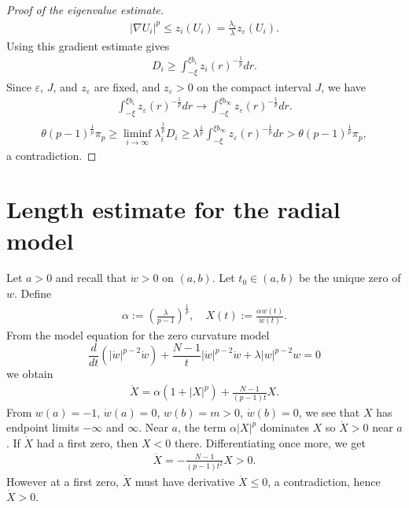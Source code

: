 \documentclass[11pt]{amsart}
\def \eps {\varepsilon}
\theoremstyle{definition}
\begin{document}
\begin{proof}[Proof of the eigenvalue estimate]
\begin{align*}
    |\nabla U_i|^p\leq z_i(U_i)=\frac{\lambda_i}{\lambda}z_\eps(U_i).
\end{align*}
Using this gradient estimate gives
\begin{align*}
    D_i \geq \int_{-\xi}^{\xi b_i}z_i(r)^{-\frac{1}{p}}dr.
\end{align*}
Since $\eps$, $J$, and $z_\eps$ are fixed, and $z_\eps>0$ on the compact interval $J$, we have
\begin{align*}
    \int_{-\xi}^{\xi b_i}z_\eps(r)^{-\frac{1}{p}}dr \to \int_{-\xi}^{\xi b_\infty}z_\eps(r)^{-\frac{1}{p}}dr.
\end{align*}
\begin{align*}
    \theta (p-1)^{\frac{1}{p}}\pi_p\geq \liminf_{i\to \infty}\lambda_i^{\frac{1}{p}}D_i\geq \lambda^{\frac{1}{p}}\int_{-\xi}^{\xi b_\infty}z_\eps(r)^{-\frac{1}{p}}dr >\theta(p-1)^{\frac{1}{p}}\pi_p,
\end{align*}
    a contradiction.
\end{proof}

\appendix
\section{Length estimate for the radial model}
Let $a >0$ and recall that $\dot{w}>0$ on $(a,b)$.   Let $t_0\in (a,b)$ be the unique zero of $w$. 
Define
\begin{align*}
    \alpha:= \left(\frac{\lambda}{p-1}\right)^{\frac{1}{p}}, \quad X(t):= \frac{\alpha w(t)}{\dot{w}(t)}.
\end{align*}
From the model equation for the zero curvature model
\begin{equation*}
     \frac{d}{dt}(|\dot{w}|^{p-2}\dot{w})+\frac{N-1}{t}|\dot{w}|^{p-2}\dot{w}+\lambda|w|^{p-2}w=0
     \end{equation*}
     we obtain
     \begin{align*}
         \dot{X}=\alpha(1+|X|^p)+\frac{N-1}{(p-1)t}X.
     \end{align*}
From $w(a)=-1$, $\dot{w}(a)=0$, $w(b)=m>0$, $\dot{w}(b)=0$, we see that $X$ has endpoint limits $-\infty$ and $\infty$.   Near $a$, the term $\alpha|X|^p$ dominates $X$ so $\dot{X}>0$ near $a$.  If $\dot{X}$ had a first zero, then $X<0$ there.  Differentiating once more, we get
\begin{align*}
    \ddot{X}=-\frac{N-1}{(p-1)t^2}X>0.
\end{align*}
However at a first zero, $\dot{X}$ must have derivative $\ddot{X}\leq 0$, a contradiction, hence $\dot{X}>0$. 
\end{document}
